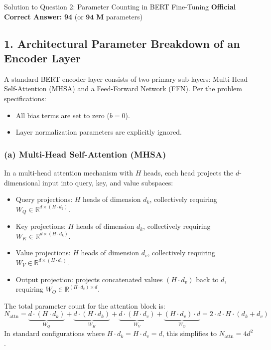 \documentclass[11pt,a4paper]{article}
\begin{document}
\vspace{0.4cm}

\begin{solutionbox}{Solution to Question 2: Parameter Counting in BERT Fine-Tuning}
\textbf{Official Correct Answer:} \textbf{94} (or $\mathbf{94\text{ M}}$ parameters)

\medskip
\subsection*{1. Architectural Parameter Breakdown of an Encoder Layer}
A standard BERT encoder layer consists of two primary sub-layers: Multi-Head Self-Attention (MHSA) and a Feed-Forward Network (FFN). Per the problem specifications:
\begin{itemize}[leftmargin=1.5em,itemsep=1pt]
    \item All bias terms are set to zero ($b = 0$).
    \item Layer normalization parameters are explicitly ignored.
\end{itemize}

\subsubsection*{(a) Multi-Head Self-Attention (MHSA)}
In a multi-head attention mechanism with $H$ heads, each head projects the $d$-dimensional input into query, key, and value subspaces:
\begin{itemize}[leftmargin=1.5em,itemsep=1pt]
    \item Query projections: $H$ heads of dimension $d_k$, collectively requiring $W_Q \in \mathbb{R}^{d \times (H \cdot d_k)}$.
    \item Key projections: $H$ heads of dimension $d_k$, collectively requiring $W_K \in \mathbb{R}^{d \times (H \cdot d_k)}$.
    \item Value projections: $H$ heads of dimension $d_v$, collectively requiring $W_V \in \mathbb{R}^{d \times (H \cdot d_v)}$.
    \item Output projection: projects concatenated values $(H \cdot d_v)$ back to $d$, requiring $W_O \in \mathbb{R}^{(H \cdot d_v) \times d}$.
\end{itemize}
The total parameter count for the attention block is:
\begin{equation}
    N_{\text{attn}} = \underbrace{d \cdot (H \cdot d_k)}_{W_Q} + \underbrace{d \cdot (H \cdot d_k)}_{W_K} + \underbrace{d \cdot (H \cdot d_v)}_{W_V} + \underbrace{(H \cdot d_v) \cdot d}_{W_O} = 2 \cdot d \cdot H \cdot (d_k + d_v)
\end{equation}
In standard configurations where $H \cdot d_k = H \cdot d_v = d$, this simplifies to $N_{\text{attn}} = 4 d^2$.


\end{solutionbox}
\end{document}
